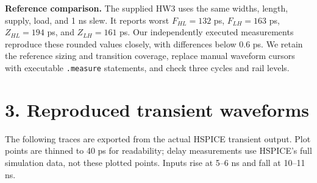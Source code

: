 \documentclass[11pt,a4paper]{article}
\begin{document}
\textbf{Reference comparison.} The supplied HW3 uses the same widths, length, supply, load, and 1 ns slew. It reports worst $F_{HL}=132$ ps, $F_{LH}=163$ ps, $Z_{HL}=194$ ps, and $Z_{LH}=161$ ps. Our independently executed measurements reproduce these rounded values closely, with differences below 0.6 ps. We retain the reference sizing and transition coverage, replace manual waveform cursors with executable \texttt{.measure} statements, and check three cycles and rail levels.
\newpage
\section*{3. Reproduced transient waveforms}
The following traces are exported from the actual HSPICE transient output. Plot points are thinned to 40 ps for readability; delay measurements use HSPICE's full simulation data, not these plotted points. Inputs rise at 5--6 ns and fall at 10--11 ns.
\end{document}
